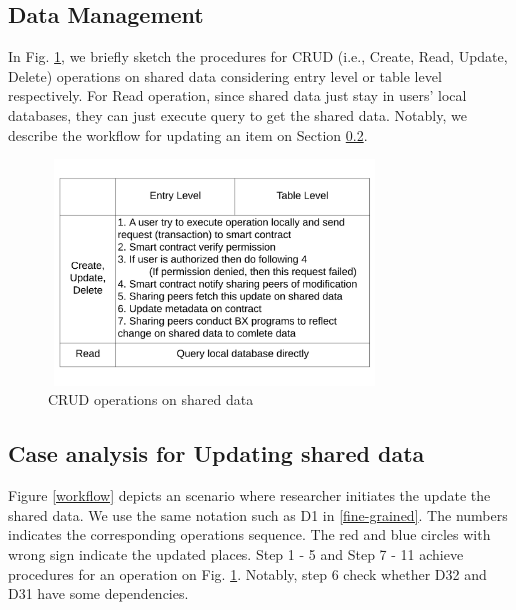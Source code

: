 \documentclass[conference]{IEEEtran}
\begin{document}
\subsection{Data Management}
In Fig. \ref{data manage}, we briefly sketch the procedures for CRUD  (i.e., Create, Read, Update, Delete) operations on shared data considering entry level or table level respectively. For Read operation, since shared data just stay in users' local databases, they can just execute query to get the shared data. Notably, we describe the workflow for updating an item on Section \ref{updateCase}.

\begin{figure}[htbp]
	\centerline{\includegraphics[width=250pt,height=170pt]{dataManage.pdf}}
	\caption{CRUD operations on shared data}
	\label{data manage}
\end{figure}

\subsection{Case analysis for Updating shared data}
\label{updateCase}

Figure \ref{workflow} depicts an scenario where researcher initiates the update the shared data. We use the same notation such as D1 in \ref{fine-grained}. The numbers indicates the corresponding operations sequence. The red and blue circles with wrong sign indicate the updated places. Step 1 - 5 and Step 7 - 11 achieve procedures for an operation on Fig. \ref{data manage}. Notably, step 6 check whether D32 and D31 have some dependencies.  
\end{document}
